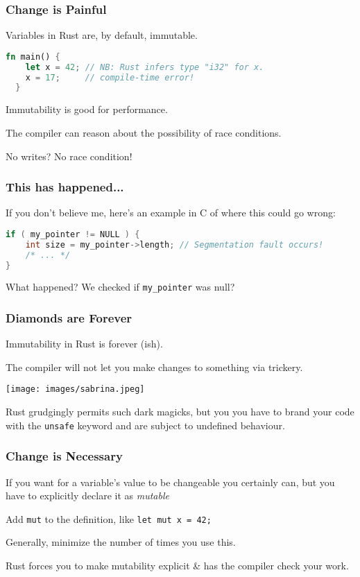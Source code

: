 \begin{frame}[fragile]
\frametitle{Change is Painful}

Variables in Rust are, by default, immutable.

\begin{lstlisting}[language=Rust]
  fn main() {
    let x = 42; // NB: Rust infers type "i32" for x.
    x = 17;     // compile-time error!
  }
\end{lstlisting}

Immutability is good for performance.

The compiler can reason about the possibility of race conditions.

No writes? No race condition!

\end{frame}


\begin{frame}[fragile]
\frametitle{This has happened...}

If you don't believe me, here's an example in C of where this could go wrong:
\begin{lstlisting}[language=C]
if ( my_pointer != NULL ) {
    int size = my_pointer->length; // Segmentation fault occurs!
    /* ... */
}
\end{lstlisting}

What happened? We checked if \texttt{my\_pointer} was null?

\end{frame}


\begin{frame}
\frametitle{Diamonds are Forever}

Immutability in Rust is forever (ish).

The compiler will not let you make changes to something via trickery.

\begin{center}
	\texttt{[image: images/sabrina.jpeg]}
\end{center}


Rust grudgingly permits such dark magicks, but you you have to brand your code with the \texttt{unsafe} keyword and are subject to undefined behaviour.

\end{frame}


\begin{frame}
\frametitle{Change is Necessary}

If you want for a variable's value to be changeable you certainly can, but you have to explicitly declare it as \textit{mutable}

Add \texttt{mut} to the definition, like \texttt{let mut x = 42;}

Generally, minimize the number of times you use this.

Rust forces you to make mutability explicit \& has the compiler check your work.

\end{frame}


